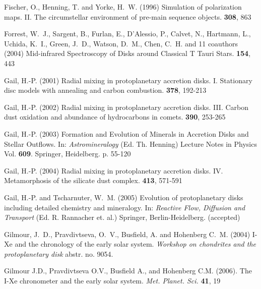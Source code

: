 \begin{literature}
\item
Fischer, O., Henning, T. and Yorke, H.~W. (1996) Simulation of polarization
maps. II. The circumstellar environment of pre-main sequence objects.
\aap \textbf{308}, 863

\item
Forrest, W.~J., Sargent, B., Furlan, E., D'Alessio, P., Calvet, N.,
Hartmann, L., Uchida, K.~I., Green, J.~D., Watson, D.~M., Chen, C.~H. and 11
coauthors (2004) Mid-infrared Spectroscopy of Disks around Classical T Tauri
Stars.
\apjs \textbf{154}, 443

\item
Gail, H.-P. (2001) Radial mixing in protoplanetary accretion disks. I.
Stationary disc models with annealing and carbon combustion. \aap
\textbf{378}, 192-213

\item
Gail, H.-P. (2002) Radial mixing in protoplanetary accretion
disks. III. Carbon dust oxidation and abundance of hydrocarbons in
comets. \aap \textbf{390}, 253-265

\item
Gail, H.-P. (2003) Formation and Evolution of Minerals in Accretion Disks
and Stellar Outflows. In: \textit{Astromineralogy} (Ed. Th. Henning) Lecture
Notes in Physics Vol. \textbf{609}. Springer, Heidelberg. p. 55-120


\item
Gail, H.-P. (2004) Radial mixing in protoplanetary accretion disks. IV.
Metamorphosis of the silicate dust complex. \aap \textbf{413}, 571-591

\item
Gail, H.-P. and Tscharnuter, W.~M. (2005) Evolution of protoplanetary disks
including detailed chemistry and mineralogy. In: \textit{Reactive Flow,
Diffusion and Transport} (Ed. R. Rannacher et. al.) Springer,
Berlin-Heidelberg.  (accepted)

\item
Gilmour, J.~D., Pravdivtseva, O.~V., Busfield, A. and Hohenberg C.~M. (2004)
I-Xe and the chronology of the early solar system.  \textit{Workshop on
chondrites and the protoplanetary disk} abstr. no. 9054.

\item 
Gilmour J.D., Pravdivtseva O.V., Busfield A., and Hohenberg C.M. (2006).
The I-Xe chronometer and the early solar system.  
\textit{Met. Planet. Sci.} \textbf{41}, 19


\end{literature}
